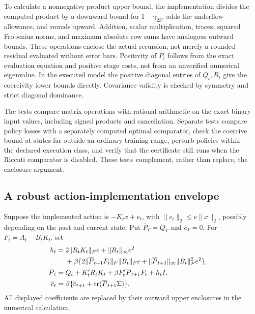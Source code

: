 To calculate a nonnegative product upper bound, the implementation divides
the computed product by a downward bound for $1-\gamma_{2k}$, adds the
underflow allowance, and rounds upward. Addition, scalar multiplication,
traces, squared Frobenius norms, and maximum absolute row sums have analogous
outward bounds. These operations enclose the actual recursion, not merely
a rounded residual evaluated without error bars. Positivity of $P_t$ follows
from the exact evaluation equation and positive stage costs, not from an
unverified numerical eigenvalue. In the executed model the positive diagonal
entries of $Q_t,R_t$ give the coercivity lower bounds directly. Covariance
validity is checked by symmetry and strict diagonal dominance.

The tests compare matrix operations with rational arithmetic on the exact
binary input values, including signed products and cancellation. Separate
tests compare policy losses with a separately computed optimal comparator,
check the coercive bound at states far outside an ordinary training range,
perturb policies within the declared execution class, and verify that the
certificate still runs when the Riccati comparator is disabled. These tests
complement, rather than replace, the enclosure argument.

\subsection{A robust action-implementation envelope}
Suppose the implemented action is $-K_tx+e_t$, with
$\|e_t\|_2\leq e\|x\|_2$, possibly depending on the past and current state.
Put $\overline P_T=Q_T$ and $\overline c_T=0$. For $F_t=A_t-B_tK_t$, set
\begin{align}
 h_t={}&2\|R_tK_t\|_F e+\|R_t\|_\infty e^2\nonumber\\
 &+\beta\{2\|\overline P_{t+1}F_t\|_F\|B_t\|_F e
             +\|\overline P_{t+1}\|_\infty\|B_t\|_F^2e^2\},
 \label{eq:r23implh}\\
 \overline P_t={}&Q_t+K_t'R_tK_t+
                    \beta F_t'\overline P_{t+1}F_t+h_tI,\nonumber\\
 \overline c_t={}&\beta\{\overline c_{t+1}+\operatorname{tr}(\overline P_{t+1}\Sigma)\}.
 \label{eq:r23implrec}
\end{align}
All displayed coefficients are replaced by their outward upper enclosures
in the numerical calculation.

